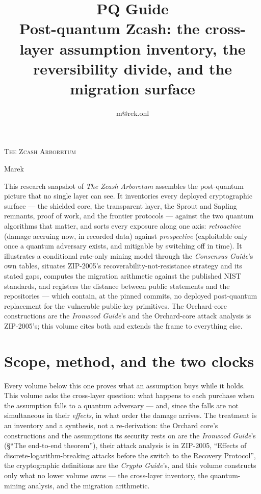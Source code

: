 \documentclass[11pt,a4paper]{article}
\title{\textbf{\Huge PQ Guide}\\[6pt]\large Post-quantum Zcash: the cross-layer assumption inventory, the reversibility divide, and the migration surface}
\author{m@rek.onl}
\date{}
\makeatletter
\theoremstyle{definition}
\let\arb@tableofcontents\tableofcontents
\renewcommand{\tableofcontents}{{\hypersetup{pdfborderstyle={/S/U/W 0}}%
  \arb@tableofcontents}}
\providecommand{\accession}{}
\def\arb@name#1#2\@nil{\def\arbvolname{#2}}
\def\arb@parsetitle\textbf#1\\[#2]#3#4\@nil{\arb@name#1\@nil\def\arb@sub{#4}}
\providecommand{\arbvolname}{}
\renewcommand{\maketitle}{\expandafter\arb@parsetitle\@title\@nil
  \hypersetup{pdftitle={\arbvolname: \arb@sub},pdfauthor={Marek}}%
  \thispagestyle{empty}\begingroup\raggedright
  {\fontsize{13.2}{16}\selectfont\scshape The Zcash Arboretum\par}
  \vspace*{50mm}
  {\fontsize{47.3}{50}\selectfont\accession\par}
  \vspace{6mm}
  {\fontsize{22.8}{27}\selectfont\arbvolname\par}
  \vspace{3mm}
  {\fontsize{13.2}{17}\selectfont\arb@sub\par}
  \vspace{18mm}
  {\fontsize{13.2}{17}\selectfont Marek\par}
  {\small\@author\par}
  \endgroup\clearpage}
\renewenvironment{abstract}{%
  \small\begin{center}{\bfseries\abstractname}\end{center}\medskip\noindent\ignorespaces
}{\par\medskip}
\makeatother
\begin{document}
\maketitle
\begin{abstract}
This research snapshot of \emph{The Zcash Arboretum} assembles the post-quantum
picture that no single layer can see. It inventories
every deployed cryptographic surface --- the shielded core, the
transparent layer, the Sprout and Sapling remnants, proof of work, and
the frontier protocols --- against the two quantum algorithms that
matter, and sorts every exposure along one axis: \emph{retroactive}
(damage accruing now, in recorded data) against \emph{prospective}
(exploitable only once a quantum adversary exists, and mitigable by
switching off in time). It illustrates a conditional rate-only mining
model through the
\emph{Consensus Guide}'s own tables, situates ZIP-2005's
recoverability-not-resistance strategy and its stated gaps, computes the
migration arithmetic against the published NIST standards, and registers
the distance between public statements and the repositories --- which
contain, at the pinned commits, no deployed post-quantum replacement for
the vulnerable public-key primitives. The Orchard-core constructions are the
\emph{Ironwood Guide}'s and the Orchard-core attack analysis is ZIP-2005's;
this volume cites both and extends the frame to everything else.
\end{abstract}
\clearpage
\tableofcontents
\clearpage

\section{Scope, method, and the two clocks}\label{sec:pq-scope}

Every volume below this one proves what an assumption buys while it
holds. This volume asks the cross-layer question: what happens to each
purchase when the assumption falls to a quantum adversary --- and, since
the falls are not simultaneous in their \emph{effects}, in what order
the damage arrives. The treatment is an inventory and a synthesis, not a
re-derivation: the Orchard core's constructions and the assumptions its
security rests on are the \emph{Ironwood Guide}'s (\S``The end-to-end
theorem''), their attack analysis is in ZIP-2005, ``Effects of
discrete-logarithm-breaking attacks before the switch to the Recovery
Protocol'', the cryptographic definitions are the \emph{Crypto Guide}'s,
and this volume constructs only what no lower volume owns ---
the cross-layer inventory, the quantum-mining analysis, and the
migration arithmetic.
\end{document}
